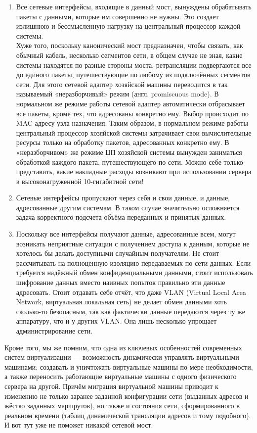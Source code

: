 \documentclass[14pt, a4paper]{article}
\begin{document}
\begin{enumerate}
    \item Все сетевые интерфейсы, входящие в данный мост, вынуждены обрабатывать пакеты с
    данными, которые им совершенно не нужны. Это создает излишнюю и бессмысленную
    нагрузку на центральный процессор каждой системы.\\

    Хуже того, поскольку канонический мост предназначен, чтобы связать, как обычный кабель, несколько
сегментов сети, в общем случае не зная, какие системы находятся по разные стороны моста,
ретрансляции подвергаются все до единого пакеты, путешествующие по любому из подключённых
сегментов сети. Для этого сетевой адаптер хозяйской машины переводится в так называемый
«неразборчивый» режим (англ. promiscuous mode). В нормальном же режиме работы сетевой
адаптер автоматически отбрасывает все пакеты, кроме тех, что адресованы конкретно ему. Выбор
происходит по MAC-адресу узла назначения. Таким образом, в нормальном режиме работы
центральный процессор хозяйской системы затрачивает свои вычислительные ресурсы только на
обработку пакетов, адресованных конкретно ему. В «неразборчивом» же режиме ЦП хозяйской
системы вынужден заниматься обработкой каждого пакета, путешествующего по сети. Можно себе
только представить, какие накладные расходы возникают при использовании сервера в
высоконагруженной 10-гигабитной сети!
\item Сетевые интерфейсы пропускают через себя и свои данные, и данные, адресованные другим
системам. В таком случае значительно осложняется задача корректного подсчета объёма
переданных и принятых данных.
\item Поскольку все интерфейсы получают данные, адресованные всем, могут возникать
неприятные ситуации с получением доступа к данным, которые не хотелось бы делать
доступными случайным получателям. Не стоит рассчитывать на полноценную изоляцию
передаваемых по сети данных. Если требуется надёжный обмен конфиденциальными
данными, стоит использовать шифрование данных вместо наивных попыток правильно эти
данные адресовать. Стоит отдавать себе отчёт, что даже VLAN (Virtual Local Area Network,
виртуальная локальная сеть) не делает обмен данными хоть сколько-то безопасным, так как
фактически данные передаются через ту же аппаратуру, что и у других VLAN. Она лишь
несколько упрощает администрирование сети.
\end{enumerate}

Кроме того, мы же помним, что одна из ключевых особенностей современных систем виртуализации
— возможность динамически управлять виртуальными машинами: создавать и уничтожать
виртуальные машины по мере необходимости, а также переносить работающие виртуальные машины
с одного физического сервера на другой. Причём миграция виртуальной машины приводит к
изменению не только заранее заданной конфигурации сети (выданных адресов и жёстко заданных
маршрутов), но также и состояния сети, сформированного в реальном времени (таблиц динамической
трансляции адресов и тому подобного). И вот тут уже не поможет никакой сетевой мост.\\
\end{document}
